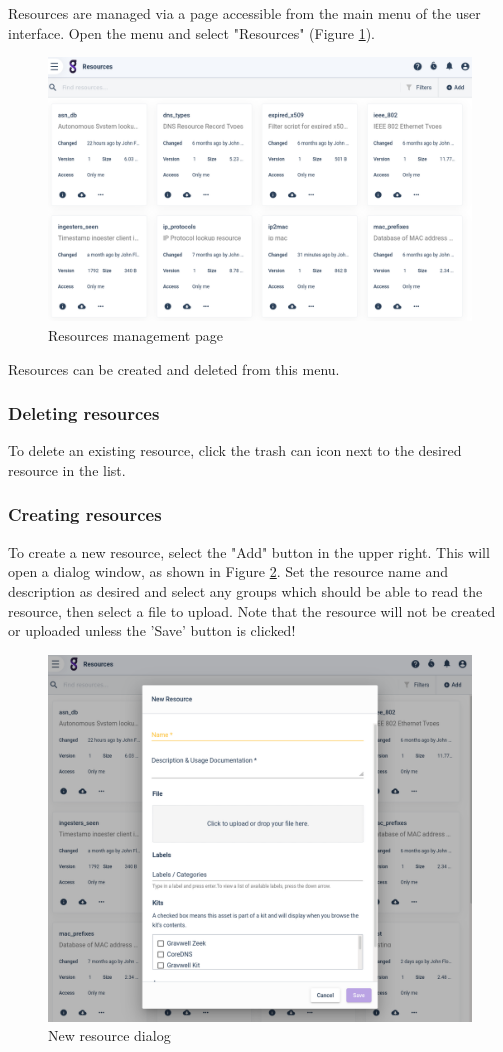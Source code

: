 Resources are managed via a page accessible from the main menu of the user interface. Open the
menu and select "Resources" (Figure \ref{fig:resource-page}).

\begin{figure}
	\includegraphics[width=0.7\linewidth]{images/resource-page.png}
	\caption{Resources management page}
	\label{fig:resource-page}
\end{figure}

Resources can be created and deleted from this menu.

\subsubsection{Deleting resources}

To delete an existing resource, click the trash can icon next to the
desired resource in the list. 

\subsubsection{Creating resources}

To create a new resource, select the "Add" button in the upper right. This
will open a dialog window, as shown in Figure \ref{fig:resource-new}.
Set the resource name and description as desired and select any groups
which should be able to read the resource, then select a file to upload.
Note that the resource will not be created or uploaded unless the 'Save'
button is clicked!

\begin{figure}
	\includegraphics[width=0.7\linewidth]{images/resource-new.png}
	\caption{New resource dialog}
	\label{fig:resource-new}
\end{figure}

